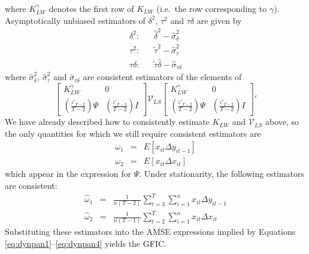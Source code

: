where $K_{LW}^\gamma$ denotes the first row of $K_{LW}$ (i.e.\ the row corresponding to $\gamma$).
Asymptotically unbiased estimators of $\delta^2$, $\tau^2$ and $\tau\delta$ are given by
\begin{eqnarray}
	\delta^2 \colon &&\widehat{\delta}^2 - \widehat{\sigma}_\delta^2\\
	\tau^2 \colon &&\widetilde{\tau}^2 - \widehat{\sigma}_\tau^2\\
	\tau \delta \colon && \widetilde{\tau}\widehat{\delta} - \widehat{\sigma}_{\tau\delta}
\end{eqnarray}
where $\widehat{\sigma}_\delta^2$, $\widehat{\sigma}_\tau^2$ and $\widehat{\sigma}_{\tau\delta}$ are consistent estimators of the elements of
$$\left[\begin{array}{cc} K_{LW}^\gamma&0 \\ \left(\frac{\iota'_{T-2}}{T-2} \right) \Psi&  \left(\frac{\iota'_{T-2}}{T-2} \right) I\end{array} \right] \mathcal{V}_{LS}  \left[\begin{array}{cc} K_{LW}^\gamma&0 \\ \left(\frac{\iota'_{T-2}}{T-2} \right) \Psi&  \left(\frac{\iota'_{T-2}}{T-2} \right) I\end{array} \right]'$$
We have already described how to consistently estimate $K_{LW}$ and $\mathcal{V}_{LS}$ above, so the only quantities for which we still require consistent estimators are 
	\begin{eqnarray}
		\omega_1 &=& E[x_{it}\Delta y_{it-1}]\\
		 \omega_2 &=& E[x_{it}\Delta x_{it}]
	\end{eqnarray}
which appear in the expression for $\Psi$.
Under stationarity, the following estimators are consistent:
		\begin{eqnarray}
		\widehat{\omega}_1 &=& \frac{1}{n(T-2)}\sum_{t=3}^T \sum_{i=1}^n x_{it}\Delta y_{it-1}\\
		 \widehat{\omega}_2 &=&\frac{1}{n(T-1)}\sum_{t=2}^T \sum_{i=1}^n x_{it}\Delta x_{it}
	\end{eqnarray}
Substituting these estimators into the AMSE expressions implied by Equations \ref{eq:dynpan1}--\ref{eq:dynpan4} yields the GFIC.
	

